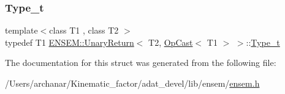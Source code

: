 \mbox{\label{structENSEM_1_1UnaryReturn_3_01T2_00_01OpCast_3_01T1_01_4_01_4_a0b016ddfbfa2d0867b9ea61f5768aa06}} 
\subsubsection{\texorpdfstring{Type\_t}{Type\_t}\hspace{0.1cm}{\footnotesize\ttfamily [2/2]}}
{\footnotesize\ttfamily template$<$class T1 , class T2 $>$ \\
typedef T1 \mbox{\hyperlink{structENSEM_1_1UnaryReturn}{E\+N\+S\+E\+M\+::\+Unary\+Return}}$<$ T2, \mbox{\hyperlink{structENSEM_1_1OpCast}{Op\+Cast}}$<$ T1 $>$ $>$\+::\mbox{\hyperlink{structENSEM_1_1UnaryReturn_3_01T2_00_01OpCast_3_01T1_01_4_01_4_a0b016ddfbfa2d0867b9ea61f5768aa06}{Type\+\_\+t}}}



The documentation for this struct was generated from the following file\+:\begin{DoxyCompactItemize}
\item 
/\+Users/archanar/\+Kinematic\+\_\+factor/adat\+\_\+devel/lib/ensem/\mbox{\hyperlink{lib_2ensem_2ensem_8h}{ensem.\+h}}\end{DoxyCompactItemize}
